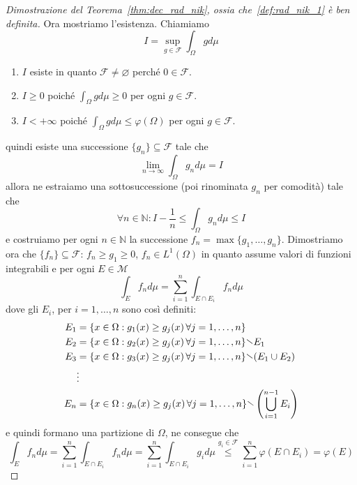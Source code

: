 \begin{proof}[Dimostrazione del Teorema~\ref{thm:dec_rad_nik}, ossia
    che~\ref{def:rad_nik_1} è ben definita]
    Ora mostriamo l'esistenza. Chiamiamo 
    \[
        I = \sup_{g \in \mathcal{F}} \int_\Omega g d\mu 
    \]
\begin{enumerate}[label = \arabic*.]
    \item \(I\) esiste in quanto \(\mathcal{F} \neq \varnothing\) perché \( 0
        \in \mathcal{F}\).
    \item  \(I \ge 0\) poiché \(\int_\Omega g d\mu \ge 0\) per ogni \(g \in
        \mathcal{F}\).
    \item \(I < +\infty\) poiché \(\int_\Omega g d\mu \le \varphi {(\Omega)}\) per
        ogni \(g \in \mathcal{F}\).
\end{enumerate}
    quindi esiste una successione \(\{g_{n}\} \subseteq \mathcal{F} \) tale che
    \[
        \lim_{n \to \infty} \int_\Omega g_{n} d\mu = I
    \]
    allora ne estraiamo una sottosuccessione (poi rinominata \(g_{n}\) per comodità) tale
    che
    \[
        \forall n \in \mathbb{N} : I - \frac{1}{n} \le \int_\Omega g_{n} d\mu
        \le I
    \]
    e costruiamo per ogni \(n \in \mathbb{N}\) la successione \(f_{n} = \max
    \{g_{1}, \dots,g_{n}\} \). Dimostriamo ora che \(\{f_{n}\} \subseteq \mathcal{F}
    \): \(f_{n} \ge g_{1} \ge 0\), \(f_{n} \in L^{1}{(\Omega)}\) in quanto
    assume valori di funzioni integrabili e per ogni \(E \in \mathcal{M}\)
    \[
        \int_E f_{n} d\mu = \sum_{i=1}^{n} \int_{E \cap E_{i}} f_{n} d\mu 
    \]
    dove gli \(E_{i}\), per \(i = 1,\dots, n\) sono così definiti:
    \begin{align*}
        E_{1} &= \{x \in \Omega : g_{1}{(x)}\ge g_{j} {(x)} \, \forall j = 1,
        \dots, n \}  \\
        E_{2} &= \{x \in \Omega : g_{2}{(x)}\ge g_{j} {(x)} \, \forall j = 1,
        \dots, n \} \sminus E_{1} \\
        E_{3} &= \{x \in \Omega : g_{3}{(x)}\ge g_{j} {(x)} \, \forall j = 1,
        \dots, n \} \sminus {(E_{1} \cup E_{2})}  \\
        &\vdots \\
            E_{n} &= \{x \in \Omega : g_{n}{(x)}\ge g_{j} {(x)} \, \forall j = 1,
        \dots, n \} \sminus \left( \bigcup_{i=1}^{n-1} E_{i} \right)
    \end{align*}
    e quindi formano una partizione di \(\Omega\), ne consegue che 
    \[
        \int_E f_{n} d\mu = \sum_{i=1}^{n} \int_{E \cap E_{i}}   f_{n} d\mu =
        \sum_{i=1}^{n} \int_{E \cap E_{i}} g_{i} d\mu
        \overset{g_{i} \in \mathcal{F}}{\le }
        \sum_{i=1}^{n} \varphi {(E \cap E_{i})} = \varphi {(E)}
\]
\end{proof}
